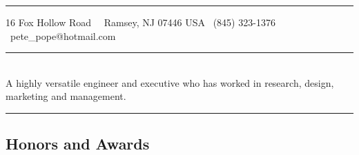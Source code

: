 \documentclass[10pt,letterpaper]{extarticle}
\begin{document}
\begin{center}
\vspace{2em}
\hrule
\vspace{0.4em}
16 Fox Hollow Road\ \textbullet
\ Ramsey, NJ  07446 USA \textbullet
\ (845) 323-1376 \textbullet
\ pete\_pope@hotmail.com
\end{center}
\vspace{-0.5em}
\hrule
\vspace{-0.6em}
\\
{
A highly versatile engineer and executive who has worked in research, design, marketing and management. }
\vspace{0.4em}\hrule
\vspace{-1em}\subsection*{\Large Honors and Awards}\vspace{-0.5em}
	
\end{document}
